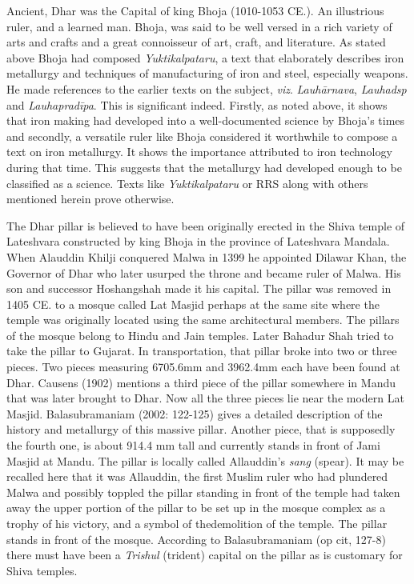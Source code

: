 Ancient, Dhar was the Capital of king Bhoja (1010-1053 CE.). An illustrious ruler, and a learned man. Bhoja, was said to be well versed in a rich variety of arts and crafts and a great connoisseur of art, craft, and literature. As stated above Bhoja had composed \textit{Yuktikalpataru}, a text that elaborately describes iron metallurgy and techniques of manufacturing of iron and steel, especially weapons. He made references to the earlier texts on the subject, \textit{viz}. \textit{Lauhārnava}, \textit{Lauhadsp} and \textit{Lauhapradīpa}. This is significant indeed. Firstly, as noted above, it shows that iron making had developed into a well-documented science by Bhoja's times and secondly, a versatile ruler like Bhoja considered it worthwhile to compose a text on iron metallurgy. It shows the importance attributed to iron technology during that time. This suggests that the metallurgy had developed enough to be classified as a science. Texts like \textit{Yuktikalpataru} or RRS along with others mentioned herein prove otherwise.

The Dhar pillar is believed to have been originally erected in the Shiva temple of Lateshvara constructed by king Bhoja in the province of Lateshvara Mandala. When Alauddin Khilji conquered Malwa in 1399 he appointed Dilawar Khan, the Governor of Dhar who later usurped the throne and became ruler of Malwa. His son and successor Hoshangshah made it his capital. The pillar was removed in 1405 CE. to a mosque called Lat Masjid perhaps at the same site where the temple was originally located using the same architectural members. The pillars of the mosque belong to Hindu and Jain temples. Later Bahadur Shah tried to take the pillar to Gujarat. In transportation, that pillar broke into two or three pieces. Two pieces measuring 6705.6mm and 3962.4mm each have been found at Dhar. Causens (1902) mentions a third piece of the pillar somewhere in Mandu that was later brought to Dhar. Now all the three pieces lie near the modern Lat Masjid. Balasubramaniam (2002: 122-125) gives a detailed description of the history and metallurgy of this massive pillar. Another piece, that is supposedly the fourth one, is about 914.4 mm tall and currently stands in front of Jami Masjid at Mandu. The pillar is locally called Allauddin's \textit{sang} (spear). It may be recalled here that it was Allauddin, the first Muslim ruler who had plundered Malwa and possibly toppled the pillar standing in front of the temple had taken away the upper portion of the pillar to be set up in the mosque complex as a trophy of his victory, and a symbol of thedemolition of the temple. The pillar stands in front of the mosque. According to Balasubramaniam (op cit, 127-8) there must have been a \textit{Trishul} (trident) capital on the pillar as is customary for Shiva temples.

